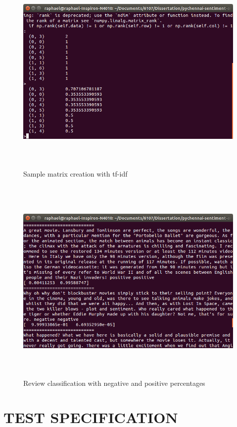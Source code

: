 \documentclass[oneside,a4paper,12pt]{pictreport}
\begin{document}
\begin{figure}[!h]
\includegraphics[width=6.0in,height=4.0in]{screenshot3.png}
\caption{Sample matrix creation with tf-idf}
\end{figure}

\begin{figure}[!h]
\includegraphics[width=6.0in,height=4.0in]{screenshot1.png}
\caption{Review classification with negative and positive percentages}
\end{figure}




\chapter{TEST SPECIFICATION}
\end{document}
